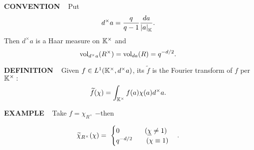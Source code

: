 \vspace{0.1cm}

\begin{x}{\small\bf CONVENTION} \ %
Put
\[
d^\times a = \frac{q}{q-1} \frac{da}{\left\vert a\right\vert_{\mathbb{K}}}.
\]
Then $d^\times a$ is a Haar measure on $\mathbb{K}^\times$ and 
\[
\text{vol}_{d^\times a} (R^\times) = \text{vol}_{da}(R) = q^{-d/2}.
\]
\end{x}

\vspace{0.1cm}

\begin{x}{\small\bf DEFINITION} \ %
Given $f \in L^1(\mathbb{K}^\times, d^\times a)$, its 
$\widetilde{f}$ is the Fourier transform of $f$ per $\mathbb{K}^\times:$
\[
\widetilde{f}(\chi) = \int_{\mathbb{K}^\times} f(a) \chi(a) d^\times a.
\]
\end{x}

\vspace{0.1cm}

\begin{x}{\small\bf EXAMPLE} \ %
Take $f = \chi_{R^\times}$ $-$then

\[
\widetilde{\chi}_{R^\times}(\chi) = \ 
\begin{cases}
0 \quad\qquad \ \  (\un{\chi} \ne 1)\\
q^{-d/2} \qquad (\chi \equiv 1)
\end{cases}
.\]

\end{x}






















